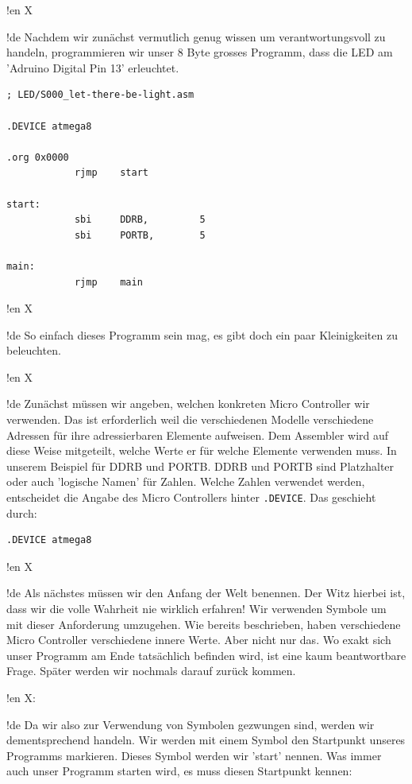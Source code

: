 !en X

!de Nachdem wir zunächst vermutlich genug wissen um verantwortungsvoll zu handeln, programmieren wir unser 8 Byte grosses Programm, dass die LED am 'Adruino Digital Pin 13' erleuchtet.



\begin{lstlisting}
; LED/S000_let-there-be-light.asm

.DEVICE atmega8

.org 0x0000
            rjmp    start 

start:
            sbi     DDRB,         5
            sbi     PORTB,        5
            
main:
            rjmp    main
\end{lstlisting}


!en X

!de So einfach dieses Programm sein mag, es gibt doch ein paar Kleinigkeiten zu beleuchten.



!en X

!de Zunächst müssen wir angeben, welchen konkreten Micro Controller wir verwenden. Das ist erforderlich weil die verschiedenen Modelle verschiedene Adressen für ihre adressierbaren Elemente aufweisen. Dem Assembler wird auf diese Weise mitgeteilt, welche Werte er für welche Elemente verwenden muss. In unserem Beispiel für DDRB und PORTB. DDRB und PORTB sind Platzhalter oder auch 'logische Namen' für Zahlen. Welche Zahlen verwendet werden, entscheidet die Angabe des Micro Controllers hinter \texttt{.DEVICE}. Das geschieht durch:

\begin{lstlisting}
.DEVICE atmega8
\end{lstlisting}



!en X

!de Als nächstes müssen wir den Anfang der Welt benennen. Der Witz hierbei ist, dass wir die volle Wahrheit nie wirklich erfahren! Wir verwenden Symbole um mit dieser Anforderung umzugehen. Wie bereits beschrieben, haben verschiedene Micro Controller verschiedene innere Werte. Aber nicht nur das. Wo exakt sich unser Programm am Ende tatsächlich befinden wird, ist eine kaum beantwortbare Frage. Später werden wir nochmals darauf zurück kommen.


!en X:

!de Da wir also zur Verwendung von Symbolen gezwungen sind, werden wir dementsprechend handeln. Wir werden mit einem Symbol den Startpunkt unseres Programms markieren. Dieses Symbol werden wir 'start' nennen. Was immer auch unser Programm starten wird, es muss diesen Startpunkt kennen:

